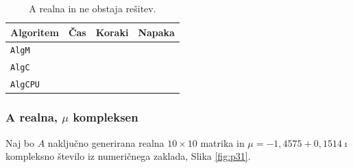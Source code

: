 \documentclass[12pt,a4paper]{amsart}
\theoremstyle{definition}
\theoremstyle{plain}
\begin{document}
\begin{table}[H]
\begin{tabular}{|l|l|c|r|}
\hline
Algoritem & Čas & Koraki & Napaka\\
\hline
\hline
\verb+AlgM+ & & & \\
\hline
\verb+AlgC+ & & & \\
\hline
\verb+AlgCPU+ & & & \\
\hline
\end{tabular}
\caption{A realna in ne obstaja rešitev.}
\label{t2}
\end{table}
\subsubsection{A realna, $\mu$ kompleksen}


Naj bo $A$ naključno generirana realna $10\times 10$ matrika in $\mu = -1,4575 + 0,1514 \imath$ kompleksno število iz numeričnega zaklada, Slika \ref{fig:p31}.
\end{document}
